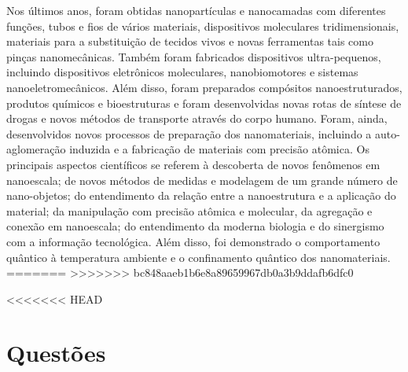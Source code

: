 \documentclass[10pt]{scrartcl}
\begin{document}
Nos últimos anos, foram obtidas nanopartículas e nanocamadas com diferentes funções, tubos e fios de vários materiais, dispositivos moleculares tridimensionais, materiais para a substituição de tecidos vivos e novas ferramentas tais como pinças nanomecânicas. Também foram fabricados dispositivos ultra-pequenos, incluindo dispositivos eletrônicos moleculares, nanobiomotores e sistemas nanoeletromecânicos. Além disso, foram preparados compósitos nanoestruturados, produtos químicos e bioestruturas e foram desenvolvidas novas rotas de síntese de drogas e novos métodos de transporte através do corpo humano. Foram, ainda, desenvolvidos novos processos de preparação dos nanomateriais, incluindo a auto-aglomeração induzida e a fabricação de materiais com precisão atômica. Os principais aspectos científicos se referem à descoberta de novos fenômenos em nanoescala; de novos métodos de medidas e modelagem de um grande número de nano-objetos; do entendimento da relação entre a nanoestrutura e a aplicação do material; da manipulação com precisão atômica e molecular, da agregação e conexão em nanoescala; do entendimento da moderna biologia e do sinergismo com a informação tecnológica. Além disso, foi demonstrado o comportamento quântico à temperatura ambiente e o confinamento quântico dos nanomateriais.
=======
>>>>>>> bc848aaeb1b6e8a89659967db0a3b9ddafb6dfc0





<<<<<<< HEAD
\section{Questões}
\label{sec:orgc6af5eb}

\end{document}
